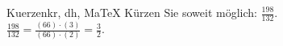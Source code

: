 \begin{MAufgabe}{Kuerzen}{kr, dh, MaTeX}
K\"urzen Sie soweit m\"oglich: $\frac{198}{132}$.\\ 
\ifLsg\MLoesung
\quad $\frac{198}{132}=\frac{(66)\cdot(3)}{(66)\cdot(2)}=\frac{3}{2}$.\else\relax\fi
 \end{MAufgabe}
